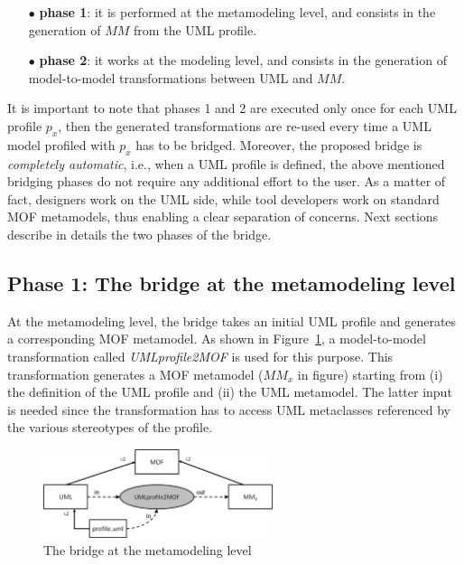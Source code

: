 \begin{itemize}
	\item[$\bullet$] \textbf{phase 1}: it is performed at the metamodeling level, and consists in the generation of $MM$ from the UML profile.
	\item[$\bullet$] \textbf{phase 2}: it works at the modeling level, and consists in the generation of model-to-model
	transformations between UML and $MM$.
\end{itemize}
%
\vspace{-.2cm}
It is important to note that phases 1 and 2 are executed only once for each UML profile $p_x$, then the generated transformations
are re-used every time a UML model profiled with $p_x$ has to be bridged.
Moreover, the proposed bridge is \textit{completely automatic}, i.e., when a UML profile is defined, the above mentioned bridging phases do not require any additional effort to the user. As a matter of fact, designers work on the UML side, while tool developers work on standard MOF metamodels, thus enabling a clear separation of concerns. Next sections describe in details the two phases of the bridge.

\vspace{-.2cm}
\subsection{Phase 1: The bridge at the metamodeling level}\label{sec:metamodelLevel}

At the metamodeling level, the bridge takes an initial UML profile and generates a corresponding MOF metamodel.
As shown in Figure~\ref{fig:metamodelingLevel}, a model-to-model transformation called
\textit{UMLprofile2MOF} is used for this purpose. This transformation generates a MOF metamodel ($MM_x$ in figure) starting from (i) the definition of the UML profile and (ii) the UML metamodel. The latter input is needed since the transformation has to access UML metaclasses referenced by the various stereotypes of the profile.
%
\vspace{-.4cm}
\begin{figure}[htbp]
	\centering
		\includegraphics[width=0.60\textwidth]{figures/metamodelingLevel.png}
	\caption{The bridge at the metamodeling level}
	\label{fig:metamodelingLevel}
\end{figure}
\vspace{-.5cm}

